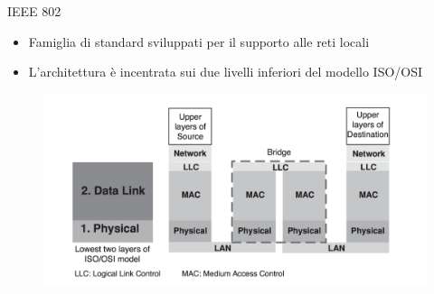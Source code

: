 \begin{frame}{IEEE 802}
	\begin{itemize}
		\item Famiglia di standard sviluppati per il supporto alle reti locali
		\item L'architettura è incentrata sui due livelli inferiori del modello ISO/OSI
	\end{itemize}
	\begin{figure}[h] 
		\includegraphics[scale=0.3,cfbox=blue_slides 1pt 0pt]{imgs/arch_ieee802.png}
	\end{figure}
\end{frame}



